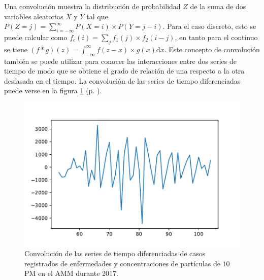 \documentclass[paper=leter, fontsize=11pt]{scrartcl}
\begin{document}
Una convolución muestra la distribución de probabilidad $Z$ de la suma de dos variables aleatorias $X$ y $Y$ tal que $P(Z = j) = \sum_{i =
-\infty}^\infty P(X = i) \times P(Y = j - i)$. Para el caso discreto, esto se puede calcular como $f_c(i) = \sum_j f_1(j) \times f_2(i - j)$, en tanto para el continuo se tiene $(f \ast g)(z) = \int_{-\infty}^\infty f(z - x) \times g(x) \text{d} x$. Este concepto de convolución también se puede utilizar para conocer las interacciones entre dos series de tiempo de modo que se obtiene el grado de relación de una respecto a la otra desfasada en el tiempo. La convolución de las series de tiempo diferenciadas puede verse en la figura \ref{conv} (p. \pageref{conv}).

\begin{figure}
  \centering
  \includegraphics{2017_ingre_PM10_conv_semana.pdf}
\caption{Convolución de las series de tiempo diferenciadas de casos registrados de enfermedades y concentraciones de partículas de $10$ PM en el AMM durante 2017.}
\label{conv}
\end{figure}




\end{document}
